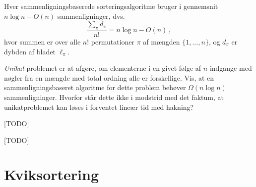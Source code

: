 \begin{thm}
  Hver sammenligningsbaserede sorteringsalgoritme bruger i gennemsnit $n\log n-O(n)$ 
  sammenligninger, dvs.
  \[ \frac{\sum_\pi d_\pi}{n!} = n\log n-O(n) \,, \]
  hvor summen er over alle $n!$ permutationer $\pi$ af mængden $\{1,\ldots,n\}$, 
  og $d_\pi$ er dybden af bladet $\ell_\pi$. 
\end{thm}

\begin{exerc}
\end{exerc}

\begin{exerc}
  \emph{Unikat}-problemet
  er at afgøre, om elementerne i en givet følge af $n$ indgange med nøgler fra en mængde med total ordning alle er forskellige. 
  Vis, at en sammenligningsbaseret algoritme for dette problem behøver
  $\Omega(n \log n)$ sammenligninger. 
  Hvorfor står dette ikke i modstrid med det faktum, at unikatproblemet kan løses i forventet lineær tid med hakning?
\end{exerc}

\begin{exerc}
  [TODO]
\end{exerc}

\begin{exerc}
  [TODO]
\end{exerc}

\section{Kviksortering}
%

